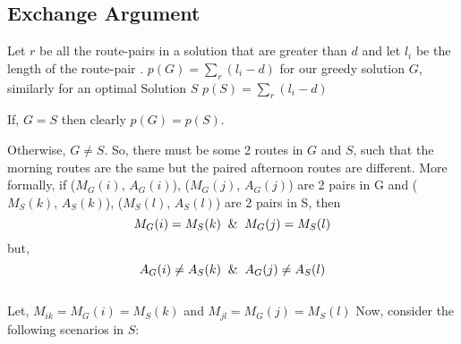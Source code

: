 \documentclass[8pt]{article}
\begin{document}
\subsection{Exchange Argument}
Let $r$ be all the route-pairs in a solution that are greater than $d$ and let $l_i$ be the length of the route-pair . $p(G) = \sum_{r}(l_i - d)$ for our greedy solution $G$, similarly for an optimal Solution $S$ $p(S) = \sum_{r}(l_i - d)$

If, $G = S$ then clearly $p(G) = p(S)$.

Otherwise, $G \neq S$. So, there must be some 2 routes in $G$ and $S$, such that the morning routes are the same but the paired afternoon routes are different. More formally, if ($M_G(i)$, $A_G(i)$), ($M_G(j)$, $A_G(j)$) are 2 pairs in G and ($M_S(k)$, $A_S(k)$), ($M_S(l)$, $A_S(l)$) are 2 pairs in S, then
$$M_G(i) = M_S(k) \And M_G(j) = M_S(l)$$
but,
$$A_G(i) \neq A_S(k) \And A_G(j) \neq A_S(l)$$ \\
Let, $M_{ik} = M_G(i) = M_S(k)$ and $M_{jl} = M_G(j) = M_S(l)$
Now, consider the following scenarios in $S$:
\end{document}
